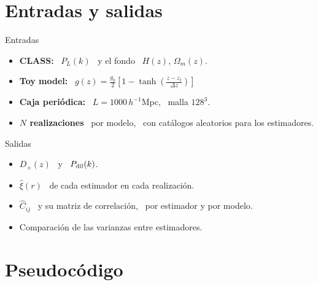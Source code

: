 \documentclass[aspectratio=169]{beamer}
\begin{document}
\section{Entradas y salidas}

\begin{frame}{Entradas}
  \begin{itemize}
    \setlength\itemsep{1.4em}
    \item \textbf{CLASS:} \ $P_L(k)$ \ y el fondo \ $H(z)$, $\Omega_m(z)$.
    \item \textbf{Toy model:} \
      $\displaystyle g(z) = \frac{g_0}{2}\left[1 - \tanh\!\left(\frac{z-z_t}{\Delta z}\right)\right]$
    \item \textbf{Caja periódica:} \ $L=1000\,h^{-1}$Mpc, \ malla $128^3$.
    \item \textbf{$N$ realizaciones} \ por modelo, \ con catálogos aleatorios para los estimadores.
  \end{itemize}
\end{frame}

\begin{frame}{Salidas}
  \begin{itemize}
    \setlength\itemsep{1.4em}
    \item $D_+(z)$ \ y \ $P_{\rm dil}(k)$.
    \item $\hat\xi(r)$ \ de cada estimador en cada realización.
    \item $\hat C_{ij}$ \ y su matriz de correlación, \ por estimador y por modelo.
    \item Comparación de las varianzas entre estimadores.
  \end{itemize}
\end{frame}

\section{Pseudocódigo}
\end{document}
